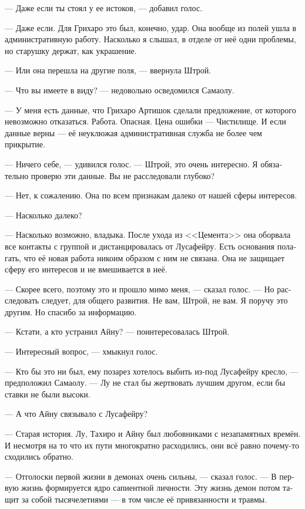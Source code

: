\documentclass[a4paper,12pt,fleqn]{book}\usepackage{polyglossia}\setdefaultlanguage[babelshorthands=true]{russian}\setotherlanguage{english}\defaultfontfeatures{Ligatures=TeX,Mapping=tex-text}\usepackage{xcolor}\newcommand{\ml}[3]{#2}
\begin{document}
{--- Даже если ты стоял у ее истоков, --- добавил голос.

--- Даже если.
Для Грихаро это был, конечно, удар.
Она вообще из полей ушла в административную работу.
Насколько я слышал, в отделе от неё одни проблемы, но старушку держат, как украшение.

--- Или она перешла на другие поля, --- ввернула Штрой.

--- Что вы имеете в виду? --- недовольно осведомился Самаолу.

--- У меня есть данные, что Грихаро Артишок сделали предложение, от которого невозможно отказаться.
Работа.
Опасная.
Цена ошибки --- Чистилище.
И если данные верны --- её неуклюжая административная служба не более чем прикрытие.

--- Ничего себе, --- удивился голос.
--- Штрой, это очень интересно.
Я обязательно проверю эти данные.
Вы не расследовали глубоко?

--- Нет, к сожалению.
Она по всем признакам далеко от нашей сферы интересов.

--- Насколько далеко?

--- Насколько возможно, владыка.
После ухода из <<Цемента>> она оборвала все контакты с группой и дистанцировалась от Лусафейру.
Есть основания полагать, что её новая работа никоим образом с ним не связана.
Она не защищает сферу его интересов и не вмешивается в неё.

--- Скорее всего, поэтому это и прошло мимо меня, --- сказал голос.
--- Но расследовать следует, для общего развития.
Не вам, Штрой, не вам.
Я поручу это другим.
Но спасибо за информацию.

--- Кстати, а кто устранил Айну? --- поинтересовалась Штрой.

--- Интересный вопрос, --- хмыкнул голос.

--- Кто бы это ни был, ему позарез хотелось выбить из-под Лусафейру кресло, --- предположил Самаолу.
--- Лу не стал бы жертвовать лучшим другом, если бы ставки не были высоки.

--- А что Айну связывало с Лусафейру?

--- Старая история.
Лу, Тахиро и Айну был любовниками с незапамятных времён.
И несмотря на то что их пути многократно расходились, они всё равно почему-то сходились обратно.

--- Отголоски первой жизни в демонах очень сильны, --- сказал голос.
--- В первую жизнь формируется ядро сапиентной личности.
Эту жизнь демон потом тащит за собой тысячелетиями --- в том числе её привязанности и травмы.

}
\end{document}
